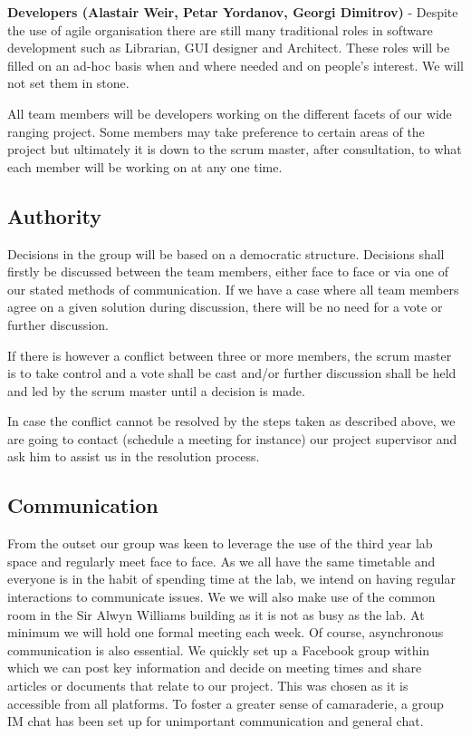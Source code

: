 \documentclass{l3proj}
\begin{document}
{\bf Developers (Alastair Weir, Petar Yordanov, Georgi Dimitrov)} - Despite the use of agile organisation there are still many traditional roles in software development such as Librarian, GUI designer and Architect.  These roles will be filled on an ad-hoc basis when and where needed and on people’s interest. We will not set them in stone.

All team members will be developers working on the different facets of our wide ranging project. Some members may take preference to certain areas of the project but ultimately it is down to the scrum master, after consultation, to what each member will be working on at any one time.

\subsection{Authority}Decisions in the group will be based on a democratic structure. Decisions shall firstly be discussed between the team members, either face to face or via one of our stated methods of communication. If we have a case where all team members agree on a given solution during discussion, there will be no need for a vote or further discussion.

If there is however a conflict between three or more members, the scrum master is to take control and a vote shall be cast and/or further discussion shall be held and led by the scrum master until a decision is made.

In case the conflict cannot be resolved by the steps taken as described above, we are going to contact (schedule a meeting for instance) our project supervisor and ask him to assist us in the resolution process.

\subsection{Communication}From the outset our group was keen to leverage the use of the third year lab space and regularly meet face to face. As we all have the same timetable and everyone is in the habit of spending time at the lab, we intend on having regular interactions to communicate issues. We we will also make use of the common room in the Sir Alwyn Williams building as it is not as busy as the lab. At minimum we will hold one formal meeting each week. Of course, asynchronous communication is also essential. We quickly set up a Facebook group within which we can post key information and decide on meeting times and share articles or documents that relate to our project. This was chosen as it is accessible from all platforms. To foster a greater sense of camaraderie, a group IM chat has been set up for unimportant communication and general chat.
\end{document}
